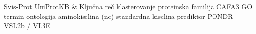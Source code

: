 Svis-Prot
UniProtKB & \en{}
Ključna reč
klasterovanje
proteinska familija
CAFA3
GO termin
ontologija
aminokiselina
(ne) standardna kiselina
prediktor
PONDR VSL2b / VL3E 
